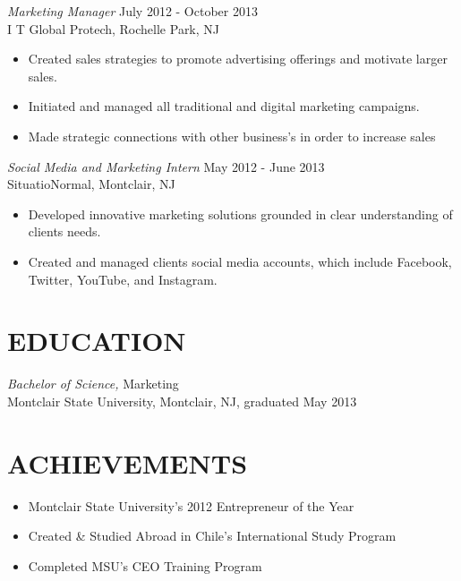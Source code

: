 \documentclass[margin]{res}
\begin{document}
\begin{resume}
                {\sl Marketing Manager} \hfill July 2012 - October 2013 \\
                I T Global Protech, Rochelle Park, NJ
                 \begin{itemize}  \itemsep -2pt %
                 \item Created sales strategies to promote advertising offerings and motivate larger sales.
                 \item Initiated and
managed all traditional and digital marketing campaigns.
                 \item Made strategic connections with other
business's in order to increase sales
                 \end{itemize}
                 
               {\sl Social Media and Marketing Intern} \hfill            May 2012 - June 2013 \\
                SituatioNormal, Montclair, NJ
                 \begin{itemize}  \itemsep -2pt %
                 \item Developed innovative marketing solutions grounded in clear
understanding of clients needs.
                 \item Created and managed clients social media accounts, which include
Facebook, Twitter, YouTube, and Instagram.
                 \end{itemize} 
 
\section{EDUCATION} {\sl Bachelor of Science,} Marketing \\
                Montclair State University, Montclair, NJ, 
                graduated May 2013 \\
\section{ACHIEVEMENTS}
\begin{itemize} 

		\item Montclair State University's 2012 Entrepreneur of the Year
		\item Created \& Studied Abroad in Chile's International Study Program
		\item Completed MSU's CEO Training Program 
					                
					                 
\end{itemize}

\end{resume}
\end{document}
